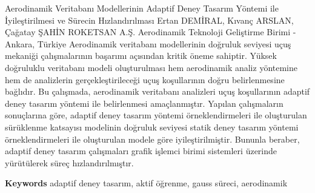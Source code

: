 
    \begin{abstract_online}{Aerodinamik Veritabanı Modellerinin Adaptif Deney Tasarım Yöntemi ile İyileştirilmesi ve Sürecin Hızlandırılması}{%
        Ertan DEMİRAL, Kıvanç ARSLAN, Çağatay ŞAHİN}{%
        }{%
        ROKETSAN A.Ş. Aerodinamik Teknoloji Geliştirme Birimi - Ankara, Türkiye}
    Aerodinamik veritabanı modellerinin doğruluk seviyesi uçuş mekaniği çalışmalarının başarımı açısından kritik öneme sahiptir. Yüksek doğruluklu veritabanı modeli oluşturulması hem aerodinamik analiz yöntemine hem de analizlerin gerçekleştirileceği uçuş koşullarının doğru belirlenmesine bağlıdır. Bu çalışmada, aerodinamik veritabanı analizleri uçuş koşullarının adaptif deney tasarım yöntemi ile belirlenmesi amaçlanmıştır. Yapılan çalışmaların sonuçlarına göre, adaptif deney tasarım yöntemi örneklendirmeleri ile oluşturulan sürüklenme katsayısı modelinin doğruluk seviyesi statik deney tasarım yöntemi örneklendirmeleri ile oluşturulan modele göre iyileştirilmiştir. Bununla beraber, adaptif deney tasarım çalışmaları grafik işlemci birimi sistemleri üzerinde yürütülerek süreç hızlandırılmıştır. 
    
        \textbf{Keywords} \newline{}adaptif deney tasarım, aktif öğrenme, gauss süreci, aerodinamik
    \end{abstract_online}
    